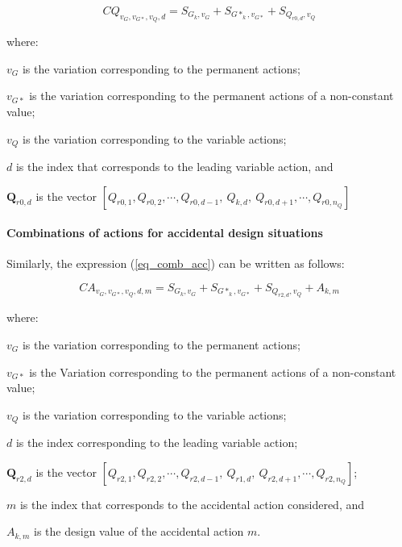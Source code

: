 \begin{equation}
CQ_{v_G,v_{G*},v_Q,d}= S_{G_k,v_G}+S_{G*_k,v_{G*}}+S_{Q_{r0,d},v_Q}
\end{equation}

\noindent where:
\begin{description}
\item{$v_G$} is the variation corresponding to the permanent actions;
\item{$v_{G*}$} is the variation corresponding to the permanent actions of a non-constant value;
\item{$v_{Q}$} is the variation corresponding to the variable actions;
\item{$d$} is the index that corresponds to the leading variable action, and
\item{$\mathbf{Q}_{r0,d}$} is the vector $[Q_{r0,1}, Q_{r0,2}, \cdots, Q_{r0,d-1},\ Q_{k,d},\ Q_{r0,d+1}, \cdots, Q_{r0,n_Q}]$
\end{description}

\paragraph{Combinations of actions for accidental design situations}
Similarly, the expression (\ref{eq_comb_acc}) can be written as follows:

\begin{equation}
CA_{v_G,v_{G*},v_Q,d,m}= S_{G_k,v_G}+S_{G*_k,v_{G*}}+S_{Q_{r2,d},v_Q}+ A_{k,m}
\end{equation}

\noindent where:
\begin{description}
\item{$v_G$} is the variation corresponding to the permanent actions;
\item{$v_{G*}$} is the Variation corresponding to the permanent actions of a non-constant value;
\item{$v_{Q}$} is the variation corresponding to the variable actions;
\item{$d$} is the index corresponding to the leading variable action;
\item{$\mathbf{Q}_{r2,d}$} is the vector $[Q_{r2,1}, Q_{r2,2}, \cdots, Q_{r2,d-1},\ Q_{r1,d},\ Q_{r2,d+1}, \cdots, Q_{r2,n_Q}]$;
\item{$m$} is the index that corresponds to the accidental action considered, and
\item{$A_{k,m}$} is the design value of the accidental action $m$.
\end{description}


